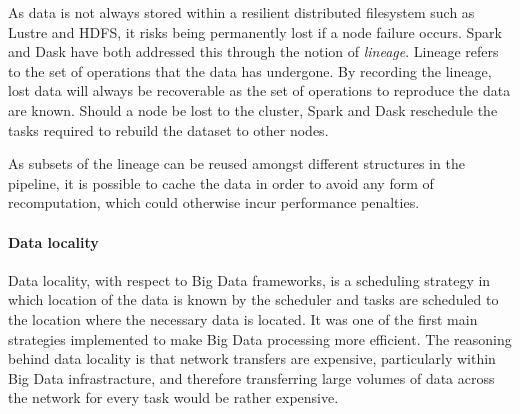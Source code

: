                     As data is not always stored within a resilient distributed
                    filesystem such as Lustre and HDFS, it risks being
                    permanently lost if a node failure occurs. Spark and Dask
                    have both addressed this through the notion of
                    \textit{lineage}. Lineage refers to the set of operations
                    that the data has undergone. By recording the lineage, lost
                    data will always be recoverable as the set of operations to
                    reproduce the data are known. Should a node be lost to the
                    cluster, Spark and Dask reschedule the tasks required to
                    rebuild the dataset to other nodes.

                    As subsets of the lineage can be reused amongst different
                    structures in the pipeline, it is possible to cache the data
                    in order to avoid any form of recomputation, which could
                    otherwise incur performance penalties.
                                      
 
                \paragraph{Data locality}
                    Data locality, with respect to Big Data frameworks, is a
                    scheduling strategy in which location of the data is known
                    by the scheduler and tasks are scheduled to the location
                    where the necessary data is located. It was one of the first
                    main strategies implemented to make Big Data processing more
                    efficient. The reasoning behind data locality is that
                    network transfers are expensive, particularly within Big
                    Data infrastracture, and therefore transferring large
                    volumes of data across the network for every task would be
                    rather expensive.

